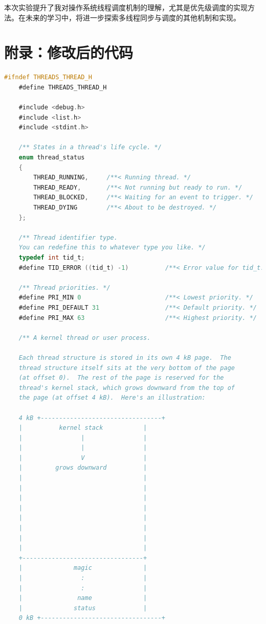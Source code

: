 \documentclass{article}
\begin{document}
本次实验提升了我对操作系统线程调度机制的理解，尤其是优先级调度的实现方法。在未来的学习中，将进一步探索多线程同步与调度的其他机制和实现。

\normalsize

\section{附录：修改后的代码}

\begin{lstlisting}[language=C, title=\texttt{thread.h}]
	#ifndef THREADS_THREAD_H
	#define THREADS_THREAD_H
	
	#include <debug.h>
	#include <list.h>
	#include <stdint.h>
	
	/** States in a thread's life cycle. */
	enum thread_status
	{
		THREAD_RUNNING,     /**< Running thread. */
		THREAD_READY,       /**< Not running but ready to run. */
		THREAD_BLOCKED,     /**< Waiting for an event to trigger. */
		THREAD_DYING        /**< About to be destroyed. */
	};
	
	/** Thread identifier type.
	You can redefine this to whatever type you like. */
	typedef int tid_t;
	#define TID_ERROR ((tid_t) -1)          /**< Error value for tid_t. */
	
	/** Thread priorities. */
	#define PRI_MIN 0                       /**< Lowest priority. */
	#define PRI_DEFAULT 31                  /**< Default priority. */
	#define PRI_MAX 63                      /**< Highest priority. */
	
	/** A kernel thread or user process.
	
	Each thread structure is stored in its own 4 kB page.  The
	thread structure itself sits at the very bottom of the page
	(at offset 0).  The rest of the page is reserved for the
	thread's kernel stack, which grows downward from the top of
	the page (at offset 4 kB).  Here's an illustration:
	
	4 kB +---------------------------------+
	|          kernel stack           |
	|                |                |
	|                |                |
	|                V                |
	|         grows downward          |
	|                                 |
	|                                 |
	|                                 |
	|                                 |
	|                                 |
	|                                 |
	|                                 |
	|                                 |
	+---------------------------------+
	|              magic              |
	|                :                |
	|                :                |
	|               name              |
	|              status             |
	0 kB +---------------------------------+
	

\end{lstlisting}
\end{document}
